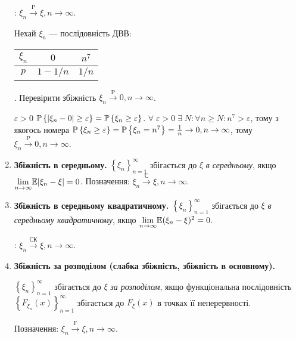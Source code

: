\begin{enumerate}
    : $\xi_n \overset{\mathrm{P}}{\longrightarrow} \xi, n \to \infty$.
    \begin{example}
        Нехай $\xi_n$ --- послідовність ДВВ: 
        \begin{tabular}{|c|c|c|}
            \hline
            $\xi_n$ & $0$ & $n^7$ \\
            \hline
            $p$ & $1-1/n$ & $1/n$ \\
            \hline
        \end{tabular}.
        Перевірити збіжність $\xi_n \overset{\mathrm{P}}{\longrightarrow} 0, n \to \infty$.
        
         $\varepsilon >0$ $\P\left\{|\xi_n -0| \geq \varepsilon\right\} = \P\left\{ \xi_n \geq \varepsilon\right\}$.
        $\forall \; \varepsilon >0 \; \exists \; N: \forall n\geq N:n^7 > \varepsilon$, тому з якогось номера
        $\P\left\{ \xi_n \geq \varepsilon\right\} = \P\left\{ \xi_n = n^7 \right\} = \frac{1}{n} \to 0, n\to\infty$, тому $\xi_n \overset{\mathrm{P}}{\longrightarrow} 0, n \to \infty$.
    \end{example}
    \item \textbf{Збіжність в середньому.}
    \noindent$\left\{ \xi_n\right\}_{n=1}^{\infty}$ збігається до $\xi$ \emph{в середньому},
    якщо $\underset{n \to \infty}{\lim} \E|\xi_n - \xi| = 0$.
    Позначення: $\xi_n \overset{\text{С}}{\longrightarrow} \xi, n \to \infty$.
    \item \textbf{Збіжність в середньому квадратичному.}
    \noindent$\left\{ \xi_n\right\}_{n=1}^{\infty}$ збігається до $\xi$ \emph{в середньому квадратичному},
    якщо $\underset{n \to \infty}{\lim} \E(\xi_n - \xi)^2 = 0$.
    
    : $\xi_n \overset{\text{СК}}{\longrightarrow} \xi, n \to \infty$.
    \item \textbf{Збіжність за розподілом (слабка збіжність, збіжність в основному).}

    \noindent$\left\{ \xi_n\right\}_{n=1}^{\infty}$ збігається до $\xi$ \emph{за розподілом}, якщо функціональна послідовність
    $\left\{ F_{\xi_n} (x)\right\}_{n=1}^{\infty}$ збігається до $F_{\xi}(x)$ в точках її неперервності.

    Позначення: $\xi_n \overset{\mathrm{F}}{\longrightarrow} \xi, n \to \infty$.


\end{enumerate}
